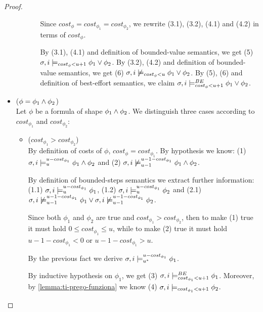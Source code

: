\begin{theorem}
\begin{proof}
\begin{itemize}
\begin{itemize}
\begin{itemize}
            Since $cost_\phi = cost_{\phi_1} = cost_{\phi_2}$, we rewrite (3.1), (3.2), (4.1) and (4.2) in terms of $cost_\phi$.

            By (3.1), (4.1) and definition of bounded-value semantics, we get (5) $\sigma,i \models_{cost_\phi < u + 1} \phi_1 \lor \phi_2$.
            By (3.2), (4.2) and definition of bounded-value semantics, we get (6) $\sigma,i \not\models_{cost_\phi < u} \phi_1 \lor \phi_2$.
            By (5), (6) and definition of best-effort semantics, we claim $\sigma,i \models_{cost_\phi < u + 1}^{BE} \phi_1 \lor \phi_2$.
         \end{itemize}
         
    \end{itemize}

    \item ($\phi = \phi_1 \land \phi_2$) \\
    Let $\phi$ be a formula of shape $\phi_1 \land \phi_2$.
    We distinguish three cases according to $cost_{\phi_1}$ and $cost_{\phi_2}$:
    \begin{itemize}
        \item ($cost_{\phi_1} > cost_{\phi_2}$) \\
        By definition of costs of $\phi$, $cost_\phi = cost_{\phi_1}$.
        By hypothesis we know: 
        (1) $\sigma, i \models_{u}^{u-cost_{\phi_1}} \phi_1 \land \phi_2$ and
        (2) $\sigma, i \not\models_{u-1}^{u-1-cost_{\phi_1}} \phi_1 \land \phi_2$.

        By definition of bounded-steps semantics we extract further information: 
        (1.1) $\sigma,i \models_{u}^{u-cost_{\phi_1}} \phi_1$,
        (1.2) $\sigma,i \models_{u}^{u-cost_{\phi_1}} \phi_2$ and
        (2.1) $\sigma,i \not\models_{u-1}^{u-1-cost_{\phi_1}} \phi_1 \lor \sigma,i \not\models_{u-1}^{u-1-cost_{\phi_1}} \phi_2$.
        
        Since both $\phi_1$ and $\phi_2$ are true and $cost_{\phi_1} > cost_{\phi_2}$, then to make (1) true it must hold $0 \leq cost_{\phi_1} \leq u$, while to make (2) true it must hold $u-1-cost_{\phi_1} < 0$ or $u-1-cost_{\phi_1} > u$. 

        By the previous fact we derive $\sigma,i \models_{{u}^*}^{u-cost_{\phi_1}} \phi_1$.
        
        By inductive hypothesis on $\phi_1$, we get (3) $\sigma, i \models_{cost_{\phi_1} < u + 1}^{BE} \phi_1$.
        Moreover, by \autoref{lemma:ti-prego-funziona} we know (4) $\sigma, i \models_{cost_{\phi_1} < u + 1} \phi_2$.
        

\end{itemize}
\end{itemize}
\end{proof}
\end{theorem}
